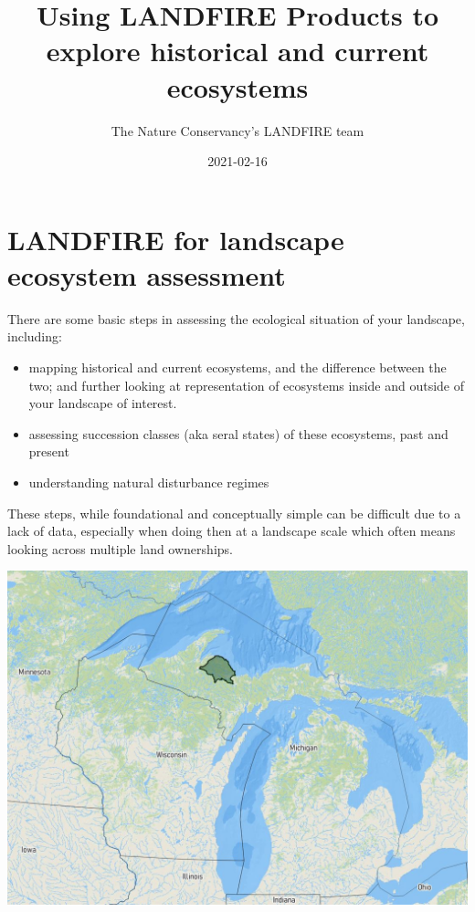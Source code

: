 \documentclass[
]{book}
\title{Using LANDFIRE Products to explore historical and current ecosystems}
\author{The Nature Conservancy's LANDFIRE team}
\date{2021-02-16}
\providecommand{\tightlist}{%
  \setlength{\itemsep}{0pt}\setlength{\parskip}{0pt}}
\begin{document}
\maketitle

{
\setcounter{tocdepth}{1}
\tableofcontents
}
\hypertarget{landfire-for-landscape-ecosystem-assessment}{%
\chapter{LANDFIRE for landscape ecosystem assessment}\label{landfire-for-landscape-ecosystem-assessment}}

There are some basic steps in assessing the ecological situation of your landscape, including:

\begin{itemize}
\tightlist
\item
  mapping historical and current ecosystems, and the difference between the two; and further looking at representation of ecosystems inside and outside of your landscape of interest.
\item
  assessing succession classes (aka seral states) of these ecosystems, past and present
\item
  understanding natural disturbance regimes
\end{itemize}

These steps, while foundational and conceptually simple can be difficult due to a lack of data, especially when doing then at a landscape scale which often means looking across multiple land ownerships.

\includegraphics[width=15.67in]{mh_locator}
\end{document}

